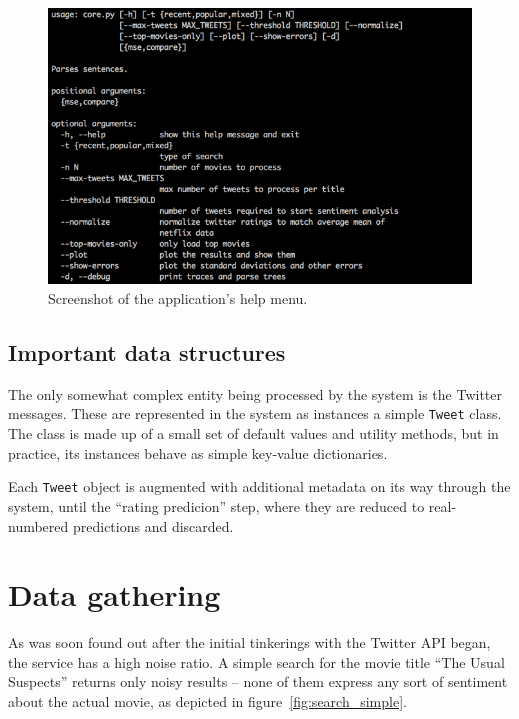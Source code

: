\begin{figure}[h]
  \centering
    \includegraphics[width=.9\textwidth]{Figures/tool_help}
  \caption{Screenshot of the application's help menu.}
  \label{fig:tool_help}
\end{figure}

\subsection{Important data structures} %
\label{sub:data_structures}

The only somewhat complex entity being processed by the system is the Twitter messages. These are represented in the system as instances a simple \texttt{Tweet} class. The class is made up of a small set of default values and utility methods, but in practice, its instances behave as simple key-value dictionaries.

Each \verb+Tweet+ object is augmented with additional metadata on its way through the system, until the ``rating predicion'' step, where they are reduced to real-numbered predictions and discarded.

\section{Data gathering} %
\label{sec:data_gathering_impl}

As was soon found out after the initial tinkerings with the Twitter API began, the service has a high noise ratio. A simple search for the movie title ``The Usual Suspects'' returns only noisy results -- none of them express any sort of sentiment about the actual movie, as depicted in figure~\ref{fig:search_simple}.

